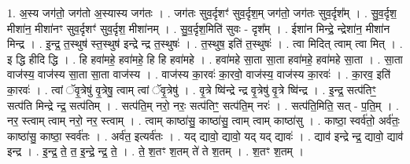 \documentclass[17pt]{extarticle}
\begin{document}
1. अ॒स्य जग॑तो॒ जग॑तो अ॒स्यास्य जग॑तः । . जग॑तः सुव॒र्दृशꣳ॑ सुव॒र्दृश॒म् जग॑तो॒ जग॑तः सुव॒र्दृश᳚म् । . सु॒व॒र्दृश॒ मीशा॑न॒ मीशा॑नꣳ सुव॒र्दृशꣳ॑ सुव॒र्दृश॒ मीशा॑नम् । . सु॒व॒र्दृश॒मिति॑ सुवः - दृश᳚म् । . ईशा॑न मिन्द्रे॒ न्द्रेशा॑न॒ मीशा॑न मिन्द्र । . इ॒न्द्र॒ त॒स्थुष॑ स्त॒स्थुष॑ इन्द्रे न्द्र त॒स्थुषः॑ । . त॒स्थुष॒ इति॑ त॒स्थुषः॑ । . त्वा मिदित् त्वाम् त्वा मित् । . इ द्धि हीदि द्धि । . हि हवा॑महे॒ हवा॑महे॒ हि हि हवा॑महे । . हवा॑महे सा॒ता सा॒ता हवा॑महे॒ हवा॑महे सा॒ता । . सा॒ता वाज॑स्य॒ वाज॑स्य सा॒ता सा॒ता वाज॑स्य । . वाज॑स्य का॒रवः॑ का॒रवो॒ वाज॑स्य॒ वाज॑स्य का॒रवः॑ । . का॒रव॒ इति॑ का॒रवः॑ । . त्वां ॅवृ॒त्रेषु॑ वृ॒त्रेषु॒ त्वाम् त्वां ॅवृ॒त्रेषु॑ । . वृ॒त्रे ष्वि॑न्द्रे न्द्र वृ॒त्रेषु॑ वृ॒त्रे ष्वि॑न्द्र । . इ॒न्द्र॒ सत्प॑तिꣳ॒॒ सत्प॑ति मिन्द्रे न्द्र॒ सत्प॑तिम् । . सत्प॑ति॒म् नरो॒ नरः॒ सत्प॑तिꣳ॒॒ सत्प॑ति॒म् नरः॑ । . सत्प॑ति॒मिति॒ सत् - प॒ति॒म् । . नर॒ स्त्वाम् त्वाम् नरो॒ नर॒ स्त्वाम् । . त्वाम् काष्ठा॑सु॒ काष्ठा॑सु॒ त्वाम् त्वाम् काष्ठा॑सु । . काष्ठा॒ स्वर्व॑तो॒ अर्व॑तः॒ काष्ठा॑सु॒ काष्ठा॒ स्वर्व॑तः । . अर्व॑त॒ इत्यर्व॑तः । . यद् द्यावो॒ द्यावो॒ यद् यद् द्यावः॑ । . द्याव॑ इन्द्रे न्द्र॒ द्यावो॒ द्याव॑ इन्द्र । . इ॒न्द्र॒ ते॒ त॒ इ॒न्द्रे॒ न्द्र॒ ते॒ । . ते॒ श॒तꣳ श॒तम् ते॑ ते श॒तम् । . श॒तꣳ श॒तम् । \newline
\end{document}
